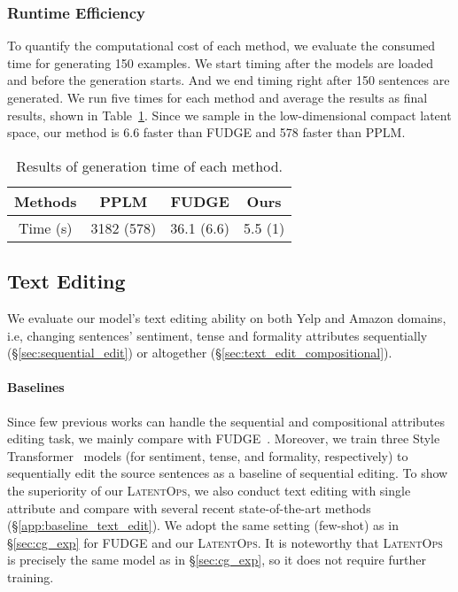 \documentclass[11pt]{article}
\begin{document}
\subsubsection{Runtime Efficiency}
\label{sec:runtime}
To quantify the computational cost of each method, we evaluate the consumed time for generating 150 examples.
We start timing after the models are loaded and before the generation starts. And we end timing right after 150 sentences are generated. We run five times for each method and average the results as final results, shown in Table~\ref{tab:time_comsumed}. Since we sample in the low-dimensional compact latent space, our method is 6.6 faster than FUDGE and 578 faster than PPLM. 
\begin{table}[t]
\small
    \centering
    \vspace{-20pt}
    \begin{tabular}{cccc}
    \toprule
    Methods & PPLM & FUDGE & Ours \\\midrule
    Time (s) & 3182 (578) & 36.1 (6.6) & 5.5 (1)\\\bottomrule
    \end{tabular}
\caption{Results of generation time of each method.}
    \label{tab:time_comsumed}
    \vspace{-10pt}
\end{table}

\subsection{Text Editing}
\label{sec:tst_exp}
We evaluate our model's text editing ability on both Yelp and Amazon domains, i.e, changing sentences' sentiment, tense and formality attributes sequentially (\S\ref{sec:sequential_edit}) or altogether (\S\ref{sec:text_edit_compositional}). 

\paragraph{Baselines}
Since few previous works can handle the sequential and compositional attributes editing task, we mainly compare with  FUDGE~\cite{DBLP:journals/corr/abs-2104-05218}. 
Moreover, we train three Style Transformer~\cite{DBLP:conf/acl/DaiLQH19} models (for sentiment, tense, and formality, respectively) to sequentially edit the source sentences as a baseline of sequential editing. 
To show the superiority of our \textsc{LatentOps}, we also conduct text editing with single attribute and compare with several recent state-of-the-art methods (\S\ref{app:baseline_text_edit}).
We adopt the same setting (few-shot) as in \S\ref{sec:cg_exp} for FUDGE and our \textsc{LatentOps}.
It is noteworthy that \textsc{LatentOps} is precisely the same model as in \S\ref{sec:cg_exp}, so it does not require further training. 
\end{document}

